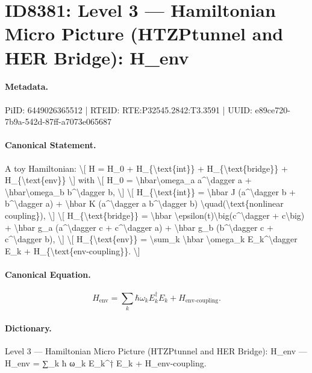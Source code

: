 \section*{ID8381: Level 3 — Hamiltonian Micro Picture (HTZPtunnel and HER Bridge): H\_env}
\paragraph{Metadata.}
PiID: 6449026365512 | RTEID: RTE:P32545.2842:T3.3591 | UUID: e89ce720-7b9a-542d-87ff-a7073e065687

\paragraph{Canonical Statement.}
A toy Hamiltonian: \textbackslash{}[ H = H\_0 + H\_\{\textbackslash{}text\{int\}\} + H\_\{\textbackslash{}text\{bridge\}\} + H\_\{\textbackslash{}text\{env\}\} \textbackslash{}] with \textbackslash{}[ H\_0 = \textbackslash{}hbar\textbackslash{}omega\_a a\textasciicircum{}\textbackslash{}dagger a + \textbackslash{}hbar\textbackslash{}omega\_b b\textasciicircum{}\textbackslash{}dagger b, \textbackslash{}] \textbackslash{}[ H\_\{\textbackslash{}text\{int\}\} = \textbackslash{}hbar J (a\textasciicircum{}\textbackslash{}dagger b + b\textasciicircum{}\textbackslash{}dagger a) + \textbackslash{}hbar K (a\textasciicircum{}\textbackslash{}dagger a b\textasciicircum{}\textbackslash{}dagger b) \textbackslash{}quad(\textbackslash{}text\{nonlinear coupling\}), \textbackslash{}] \textbackslash{}[ H\_\{\textbackslash{}text\{bridge\}\} = \textbackslash{}hbar \textbackslash{}epsilon(t)\textbackslash{}big(c\textasciicircum{}\textbackslash{}dagger + c\textbackslash{}big) + \textbackslash{}hbar g\_a (a\textasciicircum{}\textbackslash{}dagger c + c\textasciicircum{}\textbackslash{}dagger a) + \textbackslash{}hbar g\_b (b\textasciicircum{}\textbackslash{}dagger c + c\textasciicircum{}\textbackslash{}dagger b), \textbackslash{}] \textbackslash{}[ H\_\{\textbackslash{}text\{env\}\} = \textbackslash{}sum\_k \textbackslash{}hbar \textbackslash{}omega\_k E\_k\textasciicircum{}\textbackslash{}dagger E\_k + H\_\{\textbackslash{}text\{env-coupling\}\}. \textbackslash{}]

\paragraph{Canonical Equation.}
\[
H_{\text{env}} = \sum_k \hbar \omega_k E_k^\dagger E_k + H_{\text{env-coupling}}.
\]

\paragraph{Dictionary.}
Level 3 — Hamiltonian Micro Picture (HTZPtunnel and HER Bridge): H\_env — H\_env = ∑\_k ħ ω\_k E\_k\textasciicircum{}† E\_k + H\_env-coupling.

